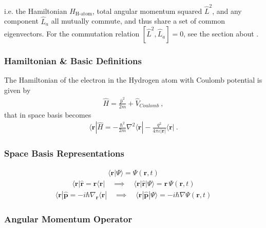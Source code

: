 \documentclass[letterpaper,10pt,english]{jupyterBook}
\begin{document}
\begin{enumerate}
\begin{equation*}
\end{equation*}
\sphinxAtStartPar
i.e. the Hamiltonian \(\hat{H}_{\text{H-atom}}\), total angular momentum squared \(\hat{L}^2\), and any component \(\hat{L}_a\) all mutually commute, and thus share a set of common eigenvectors. For the commutation relation \([\hat{L}^2, \hat{L}_a] = 0\), see the section about {\hyperref[\detokenize{ch/quantum-mechanics/angular-momentum/angular-momentum-spatial:quantum-mechanics-angular-momentum-spatial}]{}}.

\end{enumerate}


\subsubsection{Hamiltonian \& Basic Definitions}
\label{\detokenize{ch/quantum-mechanics/atom-models/schrodinger-notes:hamiltonian-basic-definitions}}
\sphinxAtStartPar
The Hamiltonian of the electron in the Hydrogen atom with Coulomb potential is given by
\begin{equation*}
\begin{split}\hat{H} = \frac{\hat{p}^2}{2m} + \hat{V}_{Coulomb} \ ,\end{split}
\end{equation*}
\sphinxAtStartPar
that in space basis becomes
\begin{equation*}
\begin{split}\langle \mathbf{r} | \hat{H} = - \frac{\hbar^2}{2 m} \nabla^2 \langle \mathbf{r} | - \frac{q^2}{4 \pi \varepsilon |\mathbf{r}|} \langle \mathbf{r} | \ .\end{split}
\end{equation*}\subsubsection*{Space Basis Representations}
\begin{equation*}
\begin{split}\langle \mathbf{r} | \Psi \rangle = \Psi(\mathbf{r}, t)\end{split}
\end{equation*}\begin{equation*}
\begin{split}\langle \mathbf{r} | \hat{\mathbf{r}} = \mathbf{r} \langle \mathbf{r} | \quad \implies \quad \langle \mathbf{r} | \hat{\mathbf{r}} | \Psi \rangle = \mathbf{r} \, \Psi(\mathbf{r}, t)\end{split}
\end{equation*}\begin{equation*}
\begin{split}\langle \mathbf{r} | \hat{\mathbf{p}} = -i\hbar \nabla_{\mathbf{r}} \langle \mathbf{r} | \quad \implies \quad \langle \mathbf{r} | \hat{\mathbf{p}} | \Psi \rangle = -i\hbar \nabla \Psi(\mathbf{r}, t)\end{split}
\end{equation*}\subsubsection*{Angular Momentum Operator}
\end{document}
